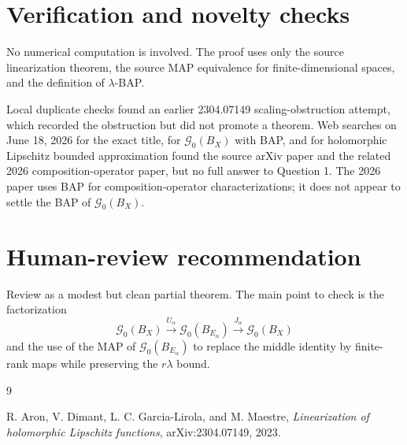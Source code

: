 \documentclass[11pt]{article}
\newcommand{\G}{\mathcal G}
\begin{document}
\section*{Verification and novelty checks}

No numerical computation is involved.  The proof uses only the source
linearization theorem, the source MAP equivalence for finite-dimensional
spaces, and the definition of \(\lambda\)-BAP.

Local duplicate checks found an earlier 2304.07149 scaling-obstruction
attempt, which recorded the obstruction but did not promote a theorem.  Web
searches on June 18, 2026 for the exact title, for \(\G_0(B_X)\) with BAP, and
for holomorphic Lipschitz bounded approximation found the source arXiv paper
and the related 2026 composition-operator paper, but no full answer to
Question 1.  The 2026 paper uses BAP for composition-operator
characterizations; it does not appear to settle the BAP of \(\G_0(B_X)\).

\section*{Human-review recommendation}

Review as a modest but clean partial theorem.  The main point to check is the
factorization
\[
  \G_0(B_X)\xrightarrow{U_\alpha}\G_0(B_{E_\alpha})
  \xrightarrow{J_\alpha}\G_0(B_X)
\]
and the use of the MAP of \(\G_0(B_{E_\alpha})\) to replace the middle identity
by finite-rank maps while preserving the \(r\lambda\) bound.

\begin{thebibliography}{9}

R. Aron, V. Dimant, L. C. Garcia-Lirola, and M. Maestre,
\emph{Linearization of holomorphic Lipschitz functions},
arXiv:2304.07149, 2023.

\end{thebibliography}
\end{document}
